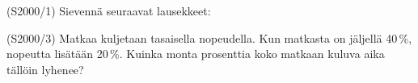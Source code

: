 \begin{tehtava}(S2000/1)   Sievennä seuraavat lausekkeet:
                        \begin{alakohdat}
                        \end{alakohdat}
\end{tehtava}

\begin{tehtava}(S2000/3)   Matkaa kuljetaan tasaisella nopeudella. Kun matkasta on
                        jäljellä 40\,\%, nopeutta lisätään 20\,\%. Kuinka monta
                        prosenttia koko matkaan kuluva aika tällöin lyhenee?
\end{tehtava}


